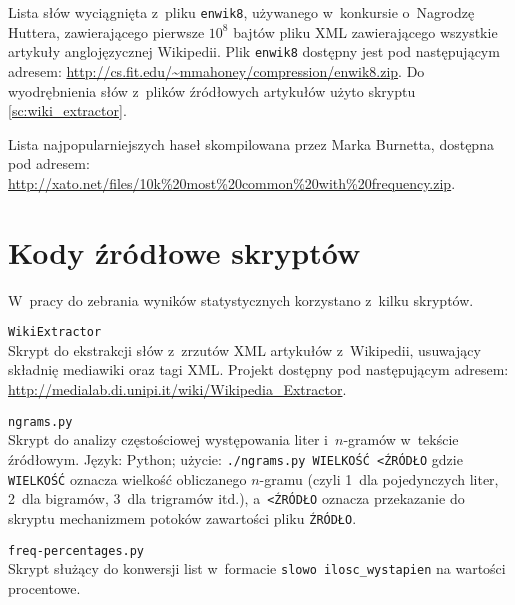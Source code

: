 \begin{appendices}
\begin{myenumerate}
        \item {}\label{wl:wiki_wordlist} Lista słów
        wyciągnięta z~pliku \texttt{enwik8}, używanego w~konkursie o~Nagrodzę
        Huttera, zawierającego pierwsze $10^8$ bajtów pliku XML zawierającego
        wszystkie artykuły anglojęzycznej \mbox{Wikipedii}. Plik
        \texttt{enwik8} dostępny jest pod następującym adresem:
        \url{http://cs.fit.edu/~mmahoney/compression/enwik8.zip}. Do
        wyodrębnienia słów z~plików źródłowych artykułów użyto skryptu
        \ref{sc:wiki_extractor}.

        \item {}\label{wl:xato_passwords} Lista
         najpopularniejszych haseł skompilowana przez Marka
        Burnetta, dostępna pod adresem:
        \url{http://xato.net/files/10k%20most%20common%20with%20frequency.zip}.

    \end{myenumerate}

\section{Kody źródłowe skryptów}
W~pracy do zebrania wyników statystycznych korzystano z~kilku skryptów.

\begin{myenumerate}

    \item {}\label{sc:wiki_extractor}
    \texttt{WikiExtractor} \\
    Skrypt do ekstrakcji słów z~zrzutów XML artykułów z~Wikipedii, usuwający
    składnię mediawiki oraz tagi XML. Projekt dostępny pod następującym
    \mbox{adresem}: \url{http://medialab.di.unipi.it/wiki/Wikipedia_Extractor}.

    \item {}\label{sc:ngrams_counter}
    \texttt{ngrams.py} \\
    Skrypt do analizy częstościowej występowania liter i~$n$-gramów w~tekście
    źródłowym. Język: Python; użycie: \texttt{./ngrams.py WIELKOŚĆ <ŹRÓDŁO}
    gdzie \texttt{WIELKOŚĆ} oznacza wielkość obliczanego $n$-gramu (czyli 1~dla
    pojedynczych liter, 2~dla bigramów, 3~dla trigramów itd.),
    a~\texttt{<ŹRÓDŁO} oznacza przekazanie do skryptu mechanizmem potoków
    zawartości pliku \texttt{ŹRÓDŁO}.
    

    \pagebreak
    \item {}\label{sc:freq_percentages}
    \texttt{freq-percentages.py} \\
    Skrypt służący do konwersji list w~formacie \texttt{slowo ilosc\_wystapien}
    na wartości procentowe.
    

\end{myenumerate}

\end{appendices}

